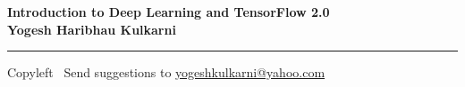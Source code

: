 
\graphicspath{{images/}}

\footnotesize


\begin{center}
\Large{\textbf{Introduction to Deep Learning and TensorFlow 2.0\\ Yogesh Haribhau Kulkarni}}  
\end{center}

\begin{multicols}{2}

\end{multicols}

\rule{\linewidth}{0.25pt}
\scriptsize
Copyleft \textcopyleft\  Send suggestions to 
\href{http://yati.io}{yogeshkulkarni@yahoo.com}


